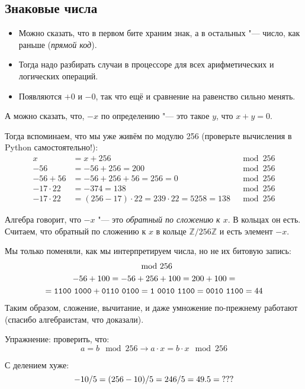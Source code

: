 \subsection{Знаковые числа}

\begin{frame}
\end{frame}

\begin{frame}
	\begin{itemize}
		\item
			Можно сказать, что в первом бите храним знак, а в остальных "--- число, как раньше (\textit{прямой код}).
		\item
			Тогда надо разбирать случаи в процессоре для всех арифметических и логических операций.
		\item
			Появляются $+0$ и $-0$, так что ещё и сравнение на равенство сильно менять.
	\end{itemize}

	А можно сказать, что, $-x$ по определению "--- это такое $y$, что $x+y=0$.

	Тогда вспоминаем, что мы уже живём по модулю 256 (проверьте вычисления в Python самостоятельно!):
	\begin{align*}
		x &= x + 256 &\mod 256 \\
		-56 &= -56 + 256 = 200 &\mod 256 \\
		-56 + 56 &= -56 + 256 + 56 = 256 = 0 &\mod 256 \\
		-17 \cdot 22 &= -374 = 138 &\mod 256 \\
		-17 \cdot 22 &= (256 - 17) \cdot 22 = 239 \cdot 22 = 5258 = 138 &\mod 256
	\end{align*}
\end{frame}

\begin{frame}
	Алгебра говорит, что $-x$ "--- это \textit{обратный по сложению к $x$}.
	В кольцах он есть.
	Считаем, что обратный по сложению к $x$ в кольце $\mathbb{Z}/256\mathbb{Z}$ и есть элемент $-x$.

	Мы только поменяли, как мы интерпретируем числа, но не их битовую запись:
	\begin{gather*}
		\mod 256 \\
		-56 + 100 = -56 + 256 + 100 = 200 + 100 = \\
		= \t{1100~1000} + \t{0110~0100} = \t{1~0010~1100} = \t{0010~1100} = 44
	\end{gather*}
	Таким образом, сложение, вычитание, и даже умножение по-прежнему работают (спасибо алгебраистам, что доказали).

	Упражнение: проверить, что:
	\[ a = b \mod 256 \rightarrow a \cdot x = b \cdot x \mod 256\]

	С делением хуже:
	\[
		-10 / 5 = (256 - 10) / 5 = 246 / 5 = 49.5 = \t{???}
	\]
\end{frame}

